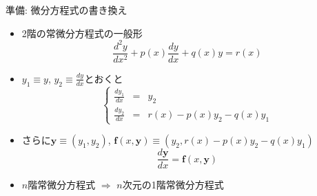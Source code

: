 \begin{frame}[t,fragile]{準備: 微分方程式の書き換え}
  \begin{itemize}
  \item 2階の常微分方程式の一般形
    \[
    \frac{d^2y}{dx^2} + p(x)\frac{dy}{dx} + q(x)y = r(x)
    \]
  \item $y_1 \equiv y$, $y_2 \equiv \frac{dy}{dx}$とおくと
    \[
    \left\{
    \begin{array}{ccl}
      \frac{dy_1}{dx} & = & y_2 \\
      \frac{dy_2}{dx} & = & r(x) - p(x) y_2 - q(x) y_1
    \end{array}
    \right.
    \]
  \item さらに$\bm{y}\equiv(y_1, y_2)$, $\bm{f}(x, \bm{y})\equiv \left(y_2, r(x)-p(x)y_2 - q(x)y_1\right)$
    \[
    \frac{d\bm{y}}{dx} = \bm{f}(x, \bm{y})
    \]
  \item $n$階常微分方程式 $\Rightarrow$ $n$次元の1階常微分方程式
  \end{itemize}
\end{frame}
